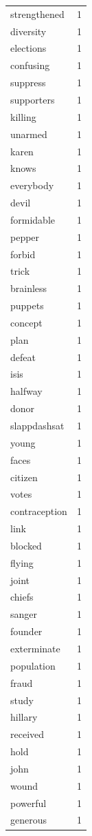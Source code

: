 \begin{tabular}{lr}
strengthened & 1 \\
diversity & 1 \\
elections & 1 \\
confusing & 1 \\
suppress & 1 \\
supporters & 1 \\
killing & 1 \\
unarmed & 1 \\
karen & 1 \\
knows & 1 \\
everybody & 1 \\
devil & 1 \\
formidable & 1 \\
pepper & 1 \\
forbid & 1 \\
trick & 1 \\
brainless & 1 \\
puppets & 1 \\
concept & 1 \\
plan & 1 \\
defeat & 1 \\
isis & 1 \\
halfway & 1 \\
donor & 1 \\
slappdashsat & 1 \\
young & 1 \\
faces & 1 \\
citizen & 1 \\
votes & 1 \\
contraception & 1 \\
link & 1 \\
blocked & 1 \\
flying & 1 \\
joint & 1 \\
chiefs & 1 \\
sanger & 1 \\
founder & 1 \\
exterminate & 1 \\
population & 1 \\
fraud & 1 \\
study & 1 \\
hillary & 1 \\
received & 1 \\
hold & 1 \\
john & 1 \\
wound & 1 \\
powerful & 1 \\
generous & 1 \\

\end{tabular}
